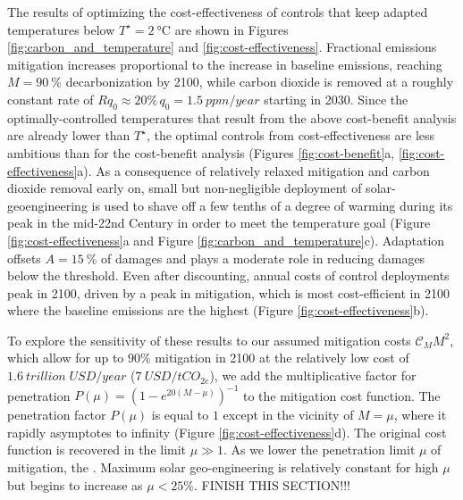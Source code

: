 \documentclass[9pt,twocolumn,twoside,lineno]{pnas-new}
\begin{document}
The results of optimizing the cost-effectiveness of controls that keep adapted temperatures below $T^{\star} = \SI{2}{\celsius}$ are shown in Figures \ref{fig:carbon_and_temperature} and \ref{fig:cost-effectiveness}. Fractional emissions mitigation increases proportional to the increase in baseline emissions, reaching $M=\SI{90}{\%}$ decarbonization by 2100, while carbon dioxide is removed at a roughly constant rate of $R q_{0} \approx 20\%\, q_{0} = \SI{1.5}{ppm/year}$ starting in 2030. Since the optimally-controlled temperatures that result from the above cost-benefit analysis are already lower than $T^{\star}$, the optimal controls from cost-effectiveness are less ambitious than for the cost-benefit analysis (Figures \ref{fig:cost-benefit}a, \ref{fig:cost-effectiveness}a). As a consequence of relatively relaxed mitigation and carbon dioxide removal early on, small but non-negligible deployment of solar-geoengineering is used to shave off a few tenths of a degree of warming during its peak in the mid-22nd Century in order to meet the temperature goal (Figure \ref{fig:cost-effectiveness}a and Figure \ref{fig:carbon_and_temperature}c). Adaptation offsets $A = \SI{15}{\%}$ of damages and plays a moderate role in reducing damages below the threshold. Even after discounting, annual costs of control deployments peak in 2100, driven by a peak in mitigation, which is most cost-efficient in 2100 where the baseline emissions are the highest (Figure \ref{fig:cost-effectiveness}b).

To explore the sensitivity of these results to our assumed mitigation costs $\mathcal{C}_{M} M^{2}$, which allow for up to $90\%$ mitigation in 2100 at the relatively low cost of $\SI{1.6}{trillion\; USD/year}$ ($\SI{7}{USD/tCO_{2e}}$), we add the multiplicative factor for penetration $P(\mu) = \left(1 - e^{20(M-\mu)}\right)^{-1}$ to the mitigation cost function. The penetration factor $P(\mu)$ is equal to $1$ except in the vicinity of $M = \mu$, where it rapidly asymptotes to infinity (Figure \ref{fig:cost-effectiveness}d). The original cost function is recovered in the limit $\mu \gg 1$. As we lower the penetration limit $\mu$ of mitigation, the . Maximum solar geo-engineering is relatively constant for high $\mu$ but begins to increase as $\mu < 25\%$. FINISH THIS SECTION!!!
\end{document}
